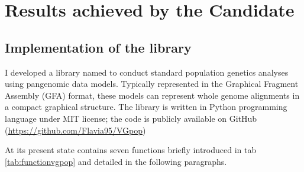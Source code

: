 


\chapter{Results achieved by the Candidate} %

\label{Chapter5} %







\section{Implementation of the \vgp library}  

I developed a library named \vgp to conduct standard population genetics analyses using pangenomic data models. Typically represented in the Graphical Fragment Assembly (GFA) format, these models can represent whole genome alignments in a compact graphical structure. The library is written in Python programming language under MIT license; the code is publicly available on GitHub (\url{https://github.com/Flavia95/VGpop}) 

At its present state \vgp contains seven functions briefly introduced in tab \ref{tab:functionvgpop} and detailed in the following paragraphs.


